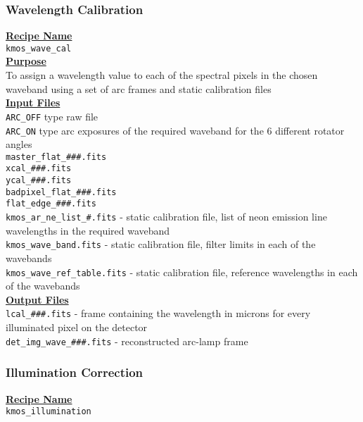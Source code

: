\documentclass{literature}
\begin{document}
\subsubsection{Wavelength Calibration}\label{subsubsec:wavelength_calib}
\textbf{\underline{Recipe Name}} \\		
\noindent
{\tt{kmos\_wave\_cal}} \\

\noindent
\textbf{\underline{Purpose}} \\	
\noindent 
To assign a wavelength value to each of the spectral pixels in the chosen waveband using a set of arc frames and static calibration files \\

\noindent
\textbf{\underline{Input Files}} \\	
 {\tt{ARC\_OFF}} type raw file \\ 
 {\tt{ARC\_ON}} type arc exposures of the required waveband for the 6 different rotator angles \\ 
\noindent
{\tt{master\_flat\_\#\#\#.fits}}\\
\noindent
{\tt{xcal\_\#\#\#.fits}}\\
\noindent
{\tt{ycal\_\#\#\#.fits}}\\
\noindent
{\tt{badpixel\_flat\_\#\#\#.fits}}\\
\noindent
{\tt{flat\_edge\_\#\#\#.fits}}\\
\noindent 
{\tt{kmos\_ar\_ne\_list\_\#.fits}} - static calibration file, list of neon emission line wavelengths in the required waveband\\
\noindent
{\tt{kmos\_wave\_band.fits}} - static calibration file, filter limits in each of the wavebands \\
\noindent
{\tt{kmos\_wave\_ref\_table.fits}} - static calibration file, reference wavelengths in each of the wavebands\\



\noindent
\textbf{\underline{Output Files}} \\	
\noindent
{\tt{lcal\_\#\#\#.fits}} - frame containing the wavelength in microns for every illuminated pixel on the detector\\
\noindent
{\tt{det\_img\_wave\_\#\#\#.fits}} - reconstructed arc-lamp frame \\

\subsubsection{Illumination Correction}\label{subsubsec:illum_cor}
\textbf{\underline{Recipe Name}} \\		
\noindent
{\tt{kmos\_illumination}} \\
\end{document}
